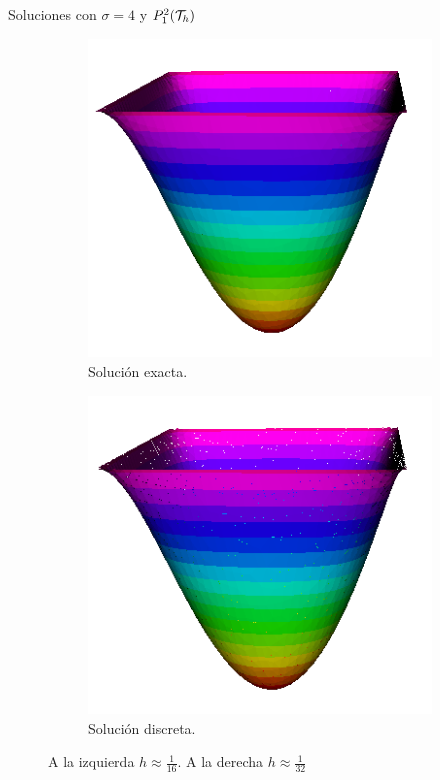 \begin{frame}{Soluciones con $\sigma=4$ y $\relax{P}^2_1(\mathcal{T}_h)$}
\begin{figure}[h!]
\begin{subfigure}[b]{0.11\textwidth}
			\end{subfigure}
			\begin{subfigure}[b]{0.215\textwidth}
				\centering
				\includegraphics[scale=0.16]{img/Difusion/Recortes/steady_diffusion_exact_n_32.png}
				\caption{Solución exacta.}
			\end{subfigure}
			\begin{subfigure}[b]{0.215\textwidth}
				\centering
				\includegraphics[scale=0.16]{img/Difusion/Recortes/steady_diffusion_approx_n_32.png}
				\caption{Solución discreta.}
			\end{subfigure}
			\caption{A la izquierda $h\approx\frac{1}{16}$. A la derecha $h\approx\frac{1}{32}$}
		\end{figure}
		\end{frame}
		
